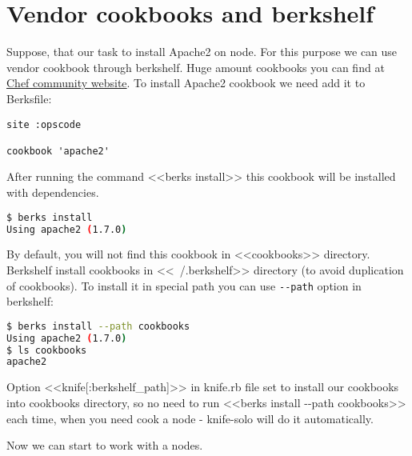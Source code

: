 \section{Vendor cookbooks and berkshelf}

Suppose, that our task to install Apache2 on node. For this purpose we can use vendor cookbook through berkshelf. Huge amount cookbooks you can find at \href{http://community.opscode.com/cookbooks}{Chef community website}. To install Apache2 cookbook we need add it to Berksfile:

\begin{lstlisting}[label=lst:my-cloud-berkshelf1,title=my-cloud/Berksfile]
site :opscode

cookbook 'apache2'
\end{lstlisting}

After running the command <<berks install>> this cookbook will be installed with dependencies.

\begin{lstlisting}[language=Bash,label=lst:my-cloud-berkshelf2]
$ berks install
Using apache2 (1.7.0)
\end{lstlisting}

By default, you will not find this cookbook in <<cookbooks>> directory. Berkshelf install cookbooks in <<~/.berkshelf>> directory (to avoid duplication of cookbooks). To install it in special path you can use \texttt{-\--path} option in berkshelf:

\begin{lstlisting}[language=Bash,label=lst:my-cloud-berkshelf3]
$ berks install --path cookbooks
Using apache2 (1.7.0)
$ ls cookbooks
apache2
\end{lstlisting}

Option <<knife[:berkshelf\_path]>> in knife.rb file set to install our cookbooks into cookbooks directory, so no need to run <<berks install -\--path cookbooks>> each time, when you need cook a node - knife-solo will do it automatically.

Now we can start to work with a nodes.
